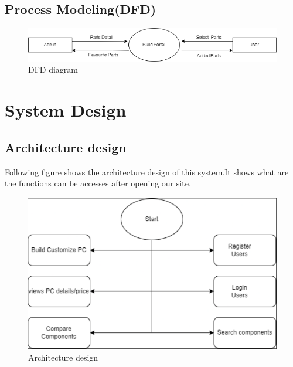       \subsection{Process Modeling(DFD)}
     \begin{figure}[ht]
      \centering
      \includegraphics[width=15cm]{Diagrams/0levDFD.drawio.png}
      \caption{DFD diagram}
     \end{figure}
     \newpage
      \section{System Design}
   \subsection{Architecture design}
   Following figure shows the architecture design of this system.It shows what are the functions can be accesses after opening our site.
   \begin{figure}[H]
   \includegraphics[width=15cm]{Diagrams/arcdesign.png}
   \caption{Architecture design}
   \end{figure}
   \newpage
